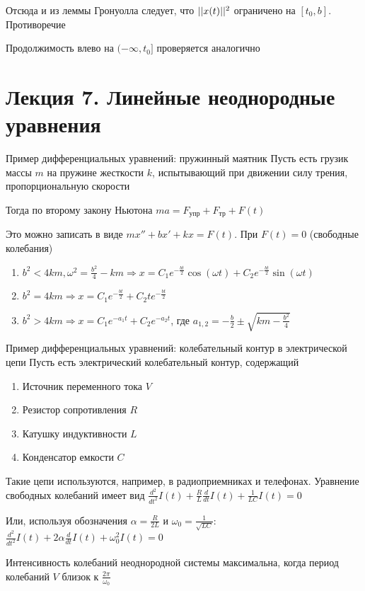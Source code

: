 \documentclass[12pt]{article}
\begin{document}
Отсюда и из леммы Гронуолла следует, что $|| x(t) ||^2$ ограничено на $[t_0, b]$. Противоречие 

Продолжимость влево на $(- \infty, t_0]$ проверяется аналогично

\newpage 

\section{Лекция 7. Линейные неоднородные уравнения}

\begin{Example}{Пример дифференциальных уравнений: пружинный маятник}
    Пусть есть грузик массы $m$ на пружине жесткости $k$, испытывающий при движении силу трения, пропорциональную скорости
    
    Тогда по второму закону Ньютона $ma = F_{\text{упр}} + F_{\text{тр}} + F(t)$

    Это можно записать в виде $mx'' + bx' + kx = F(t)$. При $F(t) = 0$ (свободные колебания)

    \begin{enumerate}
        \item $b^2 < 4km, \omega^2 = \frac{b^2}{4} - km \Rightarrow x = C_1e^{-\frac{bt}{2}}\cos(\omega t) + C_2e^{-\frac{bt}{2}}\sin(\omega t)$ 
        \item $b^2 = 4km \Rightarrow x = C_1e^{-\frac{bt}{2}} + C_2te^{-\frac{bt}{2}}$
        \item $b^2 > 4km \Rightarrow x = C_1e^{-a_1 t} + C_2e^{-a_2 t}$, где $a_{1, 2} = -\frac{b}{2} \pm \sqrt{km - \frac{b^2}{4}}$
    \end{enumerate}
\end{Example}

\begin{Example}{Пример дифференциальных уравнений: колебательный контур в электрической цепи}
    Пусть есть электрический колебательный контур, содержащий 

    \begin{enumerate}
        \item Источник переменного тока $V$
        \item Резистор сопротивления $R$
        \item Катушку индуктивности $L$
        \item Конденсатор емкости $C$
    \end{enumerate}

    Такие цепи используются, например, в радиоприемниках и телефонах. Уравнение свободных колебаний имеет вид $\frac{d^2}{dt^2}I(t) + \frac{R}{L}\frac{d}{dt}I(t) + \frac{1}{LC}I(t) = 0$

    Или, используя обозначения $\alpha = \frac{R}{2L}$ и $\omega_0 = \frac{1}{\sqrt{LC}}$: $\frac{d^2}{dt^2}I(t) + 2\alpha\frac{d}{dt}I(t) + \omega_0^2I(t) = 0$

    Интенсивность колебаний неоднородной системы максимальна, когда период колебаний $V$ близок к $\frac{2\pi}{\omega_0}$ 
\end{Example}
\end{document}
